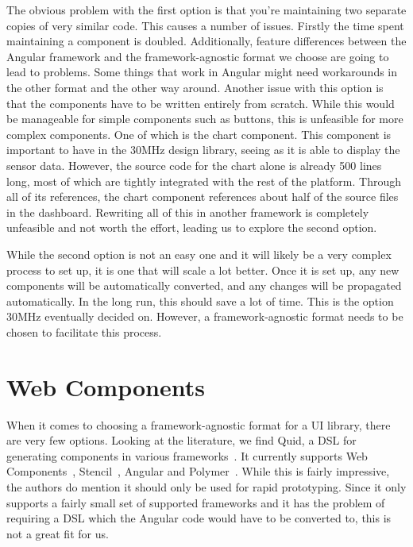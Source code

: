 The obvious problem with the first option is that you're maintaining two separate copies of very similar code. This causes a number of issues. Firstly the time spent maintaining a component is doubled. Additionally, feature differences between the Angular framework and the framework-agnostic format we choose are going to lead to problems. Some things that work in Angular might need workarounds in the other format and the other way around. Another issue with this option is that the components have to be written entirely from scratch. While this would be manageable for simple components such as buttons, this is unfeasible for more complex components. One of which is the chart component. This component is important to have in the 30MHz design library, seeing as it is able to display the sensor data. However, the source code for the chart alone is already 500 lines long, most of which are tightly integrated with the rest of the platform. Through all of its references, the chart component references about half of the source files in the dashboard. Rewriting all of this in another framework is completely unfeasible and not worth the effort, leading us to explore the second option.

While the second option is not an easy one and it will likely be a very complex process to set up, it is one that will scale a lot better. Once it is set up, any new components will be automatically converted, and any changes will be propagated automatically. In the long run, this should save a lot of time. This is the option 30MHz eventually decided on. However, a framework-agnostic format needs to be chosen to facilitate this process.

\section{Web Components}\label{sec:bg:webcomponents}
When it comes to choosing a framework-agnostic format for a UI library, there are very few options. Looking at the literature, we find Quid, a DSL for generating components in various frameworks~. It currently supports Web Components~, Stencil~, Angular and Polymer~. While this is fairly impressive, the authors do mention it should only be used for rapid prototyping. Since it only supports a fairly small set of supported frameworks and it has the problem of requiring a DSL which the Angular code would have to be converted to, this is not a great fit for us.

